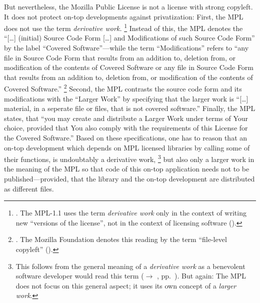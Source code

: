But nevertheless, the Mozilla Public License is not a license with strong
copyleft. It does not protect on-top developments against privatization: First,
the MPL does not use the term \emph{derivative work.}%
  \footnote{\cite[cf.][\nopage wp]{Mpl20OsiLicense2013a}. The MPL-1.1 uses the
  term \emph{derivative work} only in the context of writing new
  \enquote{versions of the license}, not in the context of licensing software
  (\cite[cf.][\nopage wp. §6.3]{Mpl11MozFoundation2013a}).}
Instead of this, the MPL denotes the
\enquote{[\ldots] (initial) Source Code Form [\ldots] and Modifications of such
Source Code Form} by the label \enquote{Covered Software}---while
the term \enquote{Modifications} refers to \enquote{any file in Source Code Form
that results from an addition to, deletion from, or modification of the contents
of Covered Software or any file in Source Code Form that results from an
addition to, deletion from, or modification of the contents of Covered
Software.}%
  \footnote{\cite[cf.][\nopage wp.\ §1.10]{Mpl20OsiLicense2013a}. The Mozilla
  Foundation denotes this reading by the term \enquote{file-level copyleft}
  (\cite[cf.][\nopage wp]{Mpl11To20MozFoundation2013a}).}
Second, the MPL contrasts the source code
form and its modifications with the \enquote{Larger Work} by specifying that the
larger work is \enquote{[\ldots] material, in a seperate file or files, that is
not covered software.}
Finally, the MPL states, that \enquote{you may create and distribute a Larger
Work under terms of Your choice, provided that You also comply with the
requirements of this License for the Covered Software.} Based on
these specifications, one has to reason that an on-top development which depends
on MPL licensed libraries by calling some of their functions, is undoubtably a
derivative work,%
  \footnote{This follows from the general meaning of a \emph{derivative work} as
  a benevolent software developer would read this term ($\rightarrow$ \oslic, pp.\
  \pageref{sec:BenevolentDerivativeWorkUnderstanding}). But again: The MPL does
  not focus on this general aspect; it uses its own concept of a \emph{larger
  work}.}
but also only a larger work in the meaning of the MPL so that code of
this on-top application needs not to be published---provided, that the library
and the on-top development are distributed as different files.%
